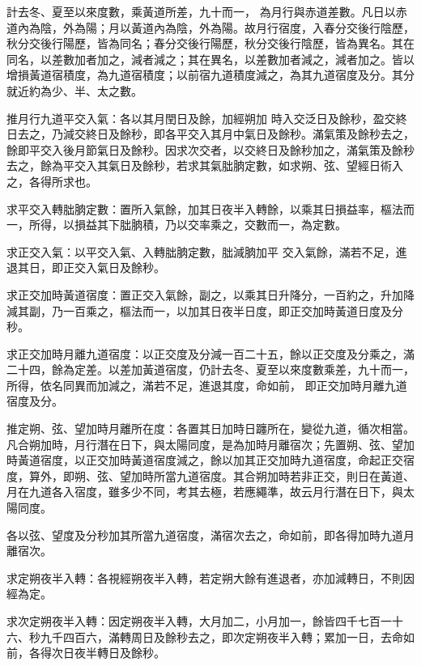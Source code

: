 \begin{pinyinscope}
 計去冬、夏至以來度數，乘黃道所差，九十而一，
 為月行與赤道差數。凡日以赤道內為陰，外為陽；月以黃道內為陰，外為陽。故月行宿度，入春分交後行陰歷，秋分交後行陽歷，皆為同名；春分交後行陽歷，秋分交後行陰歷，皆為異名。其在同名，以差數加者加之，減者減之；其在異名，以差數加者減之，減者加之。皆以增損黃道宿積度，為九道宿積度；以前宿九道積度減之，為其九道宿度及分。其分就近約為少、半、太之數。



 推月行九道平交入氣：各以其月閏日及餘，加經朔加
 時入交泛日及餘秒，盈交終日去之，乃減交終日及餘秒，即各平交入其月中氣日及餘秒。滿氣策及餘秒去之，餘即平交入後月節氣日及餘秒。因求次交者，以交終日及餘秒加之，滿氣策及餘秒去之，餘為平交入其氣日及餘秒，若求其氣朏朒定數，如求朔、弦、望經日術入之，各得所求也。



 求平交入轉朏朒定數：置所入氣餘，加其日夜半入轉餘，以乘其日損益率，樞法而一，所得，以損益其下朏朒積，乃以交率乘之，交數而一，為定數。



 求正交入氣：以平交入氣、入轉朏朒定數，朏減朒加平
 交入氣餘，滿若不足，進退其日，即正交入氣日及餘秒。



 求正交加時黃道宿度：置正交入氣餘，副之，以乘其日升降分，一百約之，升加降減其副，乃一百乘之，樞法而一，以加其日夜半日度，即正交加時黃道日度及分秒。



 求正交加時月離九道宿度：以正交度及分減一百二十五，餘以正交度及分乘之，滿二十四，餘為定差。以差加黃道宿度，仍計去冬、夏至以來度數乘差，九十而一，所得，依名同異而加減之，滿若不足，進退其度，命如前，
 即正交加時月離九道宿度及分。



 推定朔、弦、望加時月離所在度：各置其日加時日躔所在，變從九道，循次相當。凡合朔加時，月行潛在日下，與太陽同度，是為加時月離宿次；先置朔、弦、望加時黃道宿度，以正交加時黃道宿度減之，餘以加其正交加時九道宿度，命起正交宿度，算外，即朔、弦、望加時所當九道宿度。其合朔加時若非正交，則日在黃道、月在九道各入宿度，雖多少不同，考其去極，若應繩準，故云月行潛在日下，與太陽同度。



 各以弦、望度及分秒加其所當九道宿度，滿宿次去之，命如前，即各得加時九道月離宿次。



 求定朔夜半入轉：各視經朔夜半入轉，若定朔大餘有進退者，亦加減轉日，不則因經為定。



 求次定朔夜半入轉：因定朔夜半入轉，大月加二，小月加一，餘皆四千七百一十六、秒九千四百六，滿轉周日及餘秒去之，即次定朔夜半入轉；累加一日，去命如前，各得次日夜半轉日及餘秒。




\end{pinyinscope}
